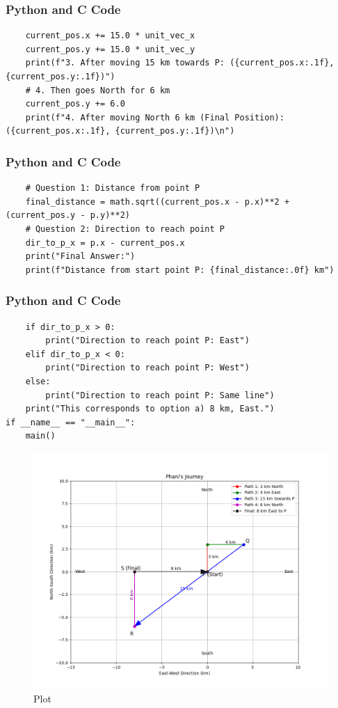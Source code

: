 \documentclass{beamer}
\begin{document}
\begin{frame}[fragile]
\frametitle{Python and C Code}
\begin{lstlisting}
    current_pos.x += 15.0 * unit_vec_x
    current_pos.y += 15.0 * unit_vec_y
    print(f"3. After moving 15 km towards P: ({current_pos.x:.1f}, {current_pos.y:.1f})")
    # 4. Then goes North for 6 km
    current_pos.y += 6.0
    print(f"4. After moving North 6 km (Final Position): ({current_pos.x:.1f}, {current_pos.y:.1f})\n")
\end{lstlisting}
\end{frame}

\begin{frame}[fragile]
\frametitle{Python and C Code}
\begin{lstlisting}
    # Question 1: Distance from point P
    final_distance = math.sqrt((current_pos.x - p.x)**2 + (current_pos.y - p.y)**2)
    # Question 2: Direction to reach point P
    dir_to_p_x = p.x - current_pos.x
    print("Final Answer:")
    print(f"Distance from start point P: {final_distance:.0f} km")
\end{lstlisting}
\end{frame}

\begin{frame}[fragile]
\frametitle{Python and C Code}
\begin{lstlisting}
    if dir_to_p_x > 0:
        print("Direction to reach point P: East")
    elif dir_to_p_x < 0:
        print("Direction to reach point P: West")
    else:
        print("Direction to reach point P: Same line")
    print("This corresponds to option a) 8 km, East.")
if __name__ == "__main__":
    main()
\end{lstlisting}
\end{frame}
\begin{frame}
\begin{figure}
    \centering
    \includegraphics[width=0.75\columnwidth]{graph19.png}
    \caption{Plot}
    \label{fig:placeholder}
\end{figure}
\end{frame}
\end{document}
